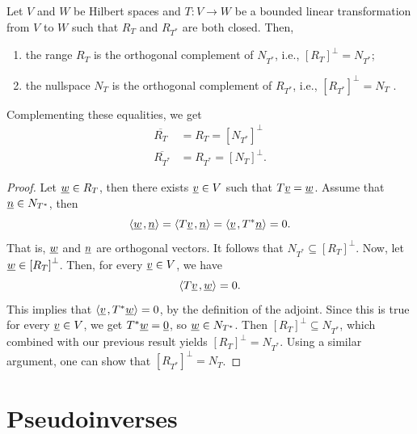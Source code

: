 \begin{theorem}
Let $V$ and $W$ be Hilbert spaces and $T \colon V \rightarrow W$ be a bounded linear transformation from $V$ to $W$ such that $R_T$ and $R_{T^*}$ are both closed.
Then,
\begin{enumerate}
\item the range $R_T$ is the orthogonal complement of $N_{T^*}$, i.e., $\left[ R_T \right]^{\bot} = N_{T^*}$;
\item the nullspace $N_T$ is the orthogonal complement of $R_{T^*}$, i.e., $\left[ R_{T^*} \right]^{\bot} = N_T$ .
\end{enumerate}
Complementing these equalities, we get
\begin{align*}
\overline{R_T} &= R_T = \left[ N_{T^*} \right]^{\bot} \\
\overline{R_{T^*}} &= R_{T^*} = \left[ N_T \right]^{\bot} .
\end{align*}
\end{theorem}
\begin{proof}
Let $\underline{w} \in R_T$, then there exists $\underline{v} \in V$ such that $T \underline{v} = \underline{w}$.
Assume that $\underline{n} \in N_{T^*}$, then
\begin{equation*}
{\left\langle  \underline{w}  \mskip2mu ,  \underline{n}  \right\rangle}
= {\left\langle  T \underline{v}  \mskip2mu ,  \underline{n}  \right\rangle}
= {\left\langle  \underline{v}  \mskip2mu ,  T^* \underline{n}  \right\rangle}
= 0 .
\end{equation*}
That is, $\underline{w}$ and $\underline{n}$ are orthogonal vectors.
It follows that $N_{T^*} \subseteq \left[ R_T \right]^{\bot}$.
Now, let $\underline{w} \in \left[ R_T \right]^{\bot}$.
Then, for every $\underline{v} \in V$, we have
\begin{equation*}
{\left\langle  T \underline{v}  \mskip2mu ,  \underline{w}  \right\rangle} = 0.
\end{equation*}
This implies that ${\left\langle  \underline{v}  \mskip2mu ,  T^* \underline{w}  \right\rangle} = 0$, by the definition of the adjoint.
Since this is true for every $\underline{v} \in V$, we get $T^* \underline{w} = \underline{0}$, so $\underline{w} \in N_{T^*}$.
Then $\left[ R_T \right]^{\bot} \subseteq N_{T^*}$, which combined with our previous result yields $\left[ R_T \right]^{\bot} = N_{T^*}$.
Using a similar argument, one can show that $\left[ R_{T^*} \right]^{\bot} = N_T$.
\end{proof}


\section{Pseudoinverses}

